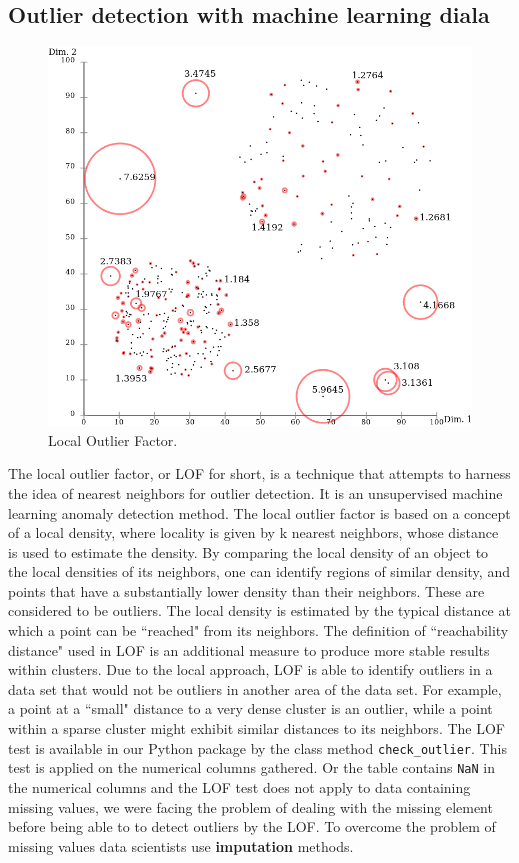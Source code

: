 \documentclass{article}
\begin{document}
\subsection{Outlier detection with machine learning diala} %
\label{sub:Outlier detection with machine learning}
\begin{figure}[H]
    \centering
    \includegraphics[width=0.6\linewidth]{picture/lof.png}
    \caption{Local Outlier Factor.}
    \label{fig:lof}
\end{figure}
The local outlier factor, or LOF for short, is a technique that attempts to harness the idea of nearest neighbors for outlier detection.
It is an unsupervised machine learning anomaly detection method.
The local outlier factor is based on a concept of a local density, where locality is given by k nearest neighbors, whose distance is used to estimate the density.
By comparing the local density of an object to the local densities of its neighbors, one can identify regions of similar density, and points that have a substantially lower density than their neighbors. These are considered to be outliers.
The local density is estimated by the typical distance at which a point can be ``reached" from its neighbors.
The definition of ``reachability distance" used in LOF is an additional measure to produce more stable results within clusters.
Due to the local approach, LOF is able to identify outliers in a data set that would not be outliers in another area of the data set.
For example, a point at a ``small" distance to a very dense cluster is an outlier, while a point within a sparse cluster might exhibit similar distances to its neighbors.
The LOF test is available in our Python package by the class method \texttt{check\_outlier}.
This test is applied on the numerical columns gathered.
Or the table contains \texttt{NaN} in the numerical columns and the LOF test does not apply to data containing missing values, we were facing the problem of dealing with the missing element before being able to to detect outliers by the LOF.
To overcome the problem of missing values data scientists use \textbf{imputation} methods.\\
\end{document}
